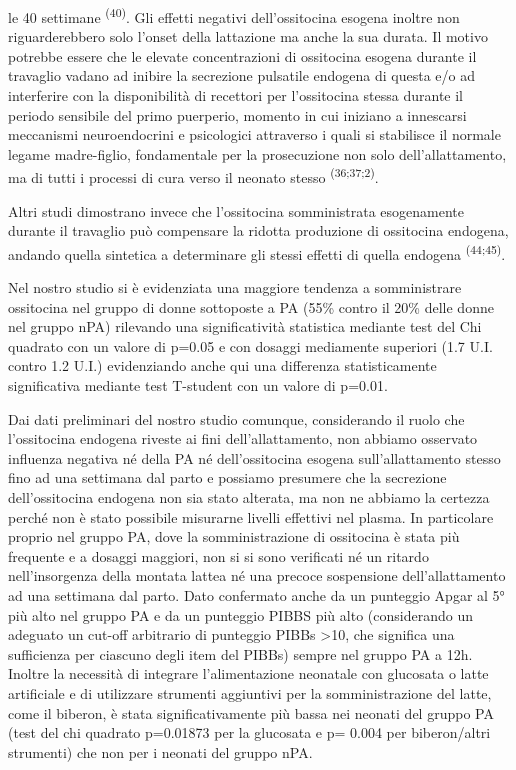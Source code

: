 \documentclass[]{article}
\begin{document}
le 40 settimane \textsuperscript{(40)}. Gli effetti negativi
dell'ossitocina esogena inoltre non riguarderebbero solo l'onset della
lattazione ma anche la sua durata. Il motivo potrebbe essere che le
elevate concentrazioni di ossitocina esogena durante il travaglio vadano
ad inibire la secrezione pulsatile endogena di questa e/o ad interferire
con la disponibilità di recettori per l'ossitocina stessa durante il
periodo sensibile del primo puerperio, momento in cui iniziano a
innescarsi meccanismi neuroendocrini e psicologici attraverso i quali si
stabilisce il normale legame madre-figlio, fondamentale per la
prosecuzione non solo dell'allattamento, ma di tutti i processi di cura
verso il neonato stesso \textsuperscript{(36;37;2)}.

Altri studi dimostrano invece che l'ossitocina somministrata
esogenamente durante il travaglio può compensare la ridotta produzione
di ossitocina endogena, andando quella sintetica a determinare gli
stessi effetti di quella endogena \textsuperscript{(44;45)}.

Nel nostro studio si è evidenziata una maggiore tendenza a somministrare
ossitocina nel gruppo di donne sottoposte a PA (55\% contro il 20\%
delle donne nel gruppo nPA) rilevando una significatività statistica
mediante test del Chi quadrato con un valore di p=0.05 e con dosaggi
mediamente superiori (1.7 U.I. contro 1.2 U.I.) evidenziando anche qui
una differenza statisticamente significativa mediante test T-student con
un valore di p=0.01.

Dai dati preliminari del nostro studio comunque, considerando il ruolo
che l'ossitocina endogena riveste ai fini dell'allattamento, non abbiamo
osservato influenza negativa né della PA né dell'ossitocina esogena
sull'allattamento stesso fino ad una settimana dal parto e possiamo
presumere che la secrezione dell'ossitocina endogena non sia stato
alterata, ma non ne abbiamo la certezza perché non è stato possibile
misurarne livelli effettivi nel plasma. In particolare proprio nel
gruppo PA, dove la somministrazione di ossitocina è stata più frequente
e a dosaggi maggiori, non si si sono verificati né un ritardo
nell'insorgenza della montata lattea né una precoce sospensione
dell'allattamento ad una settimana dal parto. Dato confermato anche da
un punteggio Apgar al 5° più alto nel gruppo PA e da un punteggio PIBBS
più alto (considerando un adeguato un cut-off arbitrario di punteggio
PIBBs \textgreater{}10, che significa una sufficienza per ciascuno degli
item del PIBBs) sempre nel gruppo PA a 12h. Inoltre la necessità di
integrare l'alimentazione neonatale con glucosata o latte artificiale e
di utilizzare strumenti aggiuntivi per la somministrazione del latte,
come il biberon, è stata significativamente più bassa nei neonati del
gruppo PA (test del chi quadrato p=0.01873 per la glucosata e p= 0.004
per biberon/altri strumenti) che non per i neonati del gruppo nPA.
\end{document}
